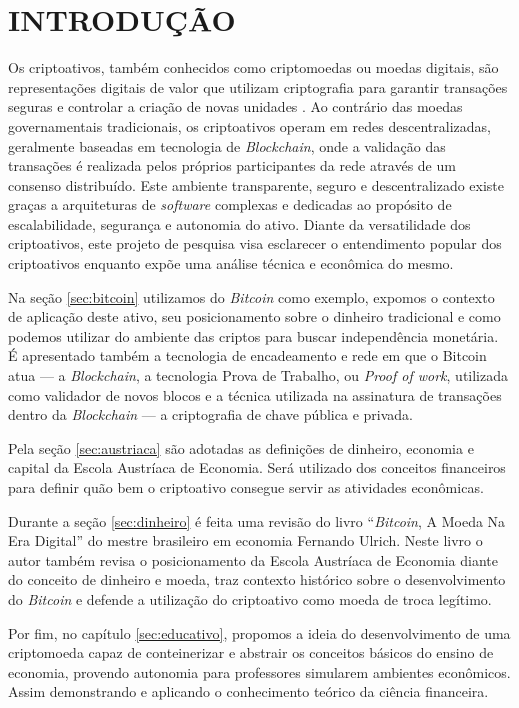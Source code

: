 \section*{INTRODUÇÃO}

Os criptoativos, também conhecidos como criptomoedas ou moedas digitais, são representações digitais de valor que utilizam criptografia para garantir transações seguras e controlar a criação de novas unidades \cite{Yetmar2023}. Ao contrário das moedas governamentais tradicionais, os criptoativos operam em redes descentralizadas, geralmente baseadas em tecnologia de \textit{Blockchain}, onde a validação das transações é realizada pelos próprios participantes da rede através de um consenso distribuído. Este ambiente transparente, seguro e descentralizado existe graças a arquiteturas de \textit{software} complexas e dedicadas ao propósito de escalabilidade, segurança e autonomia do ativo. Diante da versatilidade dos criptoativos, este projeto de pesquisa visa esclarecer o entendimento popular dos criptoativos enquanto expõe uma análise técnica e econômica do mesmo. 

Na seção \ref*{sec:bitcoin} utilizamos do \textit{Bitcoin} como exemplo, expomos o contexto de aplicação deste ativo, seu posicionamento sobre o dinheiro tradicional e como podemos utilizar do ambiente das criptos para buscar independência monetária. É apresentado também a tecnologia de encadeamento e rede em que o Bitcoin atua — a \textit{Blockchain}, a tecnologia Prova de Trabalho, ou \textit{Proof of work}, utilizada como validador de novos blocos e a técnica utilizada na assinatura de transações dentro da \textit{Blockchain} — a criptografia de chave pública e privada.

Pela seção \ref*{sec:austriaca} são adotadas as definições de dinheiro, economia e capital da Escola Austríaca de Economia. Será utilizado dos conceitos financeiros para definir quão bem o criptoativo consegue servir as atividades econômicas.

Durante a seção \ref*{sec:dinheiro} é feita uma revisão do livro ``\textit{Bitcoin}, A Moeda Na Era Digital'' do mestre brasileiro em economia Fernando Ulrich. Neste livro o autor também revisa o posicionamento da Escola Austríaca de Economia diante do conceito de dinheiro e moeda, traz contexto histórico sobre o desenvolvimento do \textit{Bitcoin} e defende a utilização do criptoativo como moeda de troca legítimo.


Por fim, no capítulo \ref*{sec:educativo}, propomos a ideia do desenvolvimento de uma criptomoeda capaz de conteinerizar e abstrair os conceitos básicos do ensino de economia, provendo autonomia para professores simularem ambientes econômicos. Assim demonstrando e aplicando o conhecimento teórico da ciência financeira.

